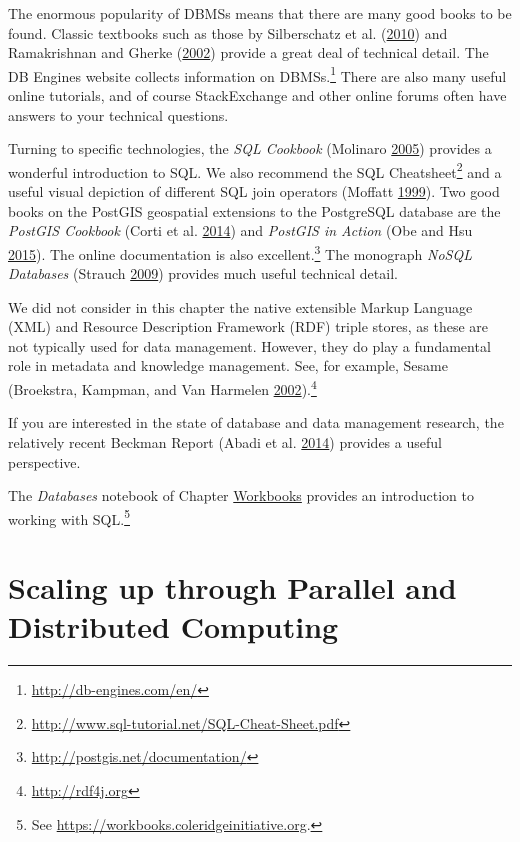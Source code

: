 \documentclass[]{krantz}
\begin{document}
The enormous popularity of DBMSs means that there are many good books to
be found. Classic textbooks such as those by Silberschatz et al.
(\protect\hyperlink{ref-silberschatz2010database}{2010}) and
Ramakrishnan and Gherke
(\protect\hyperlink{ref-ramakrishnan2000database}{2002}) provide a great
deal of technical detail. The DB Engines website collects information on
DBMSs.\footnote{\url{http://db-engines.com/en/}} There are also many
useful online tutorials, and of course StackExchange and other online
forums often have answers to your technical questions.

Turning to specific technologies, the \emph{SQL Cookbook} (Molinaro
\protect\hyperlink{ref-SQLCookbook}{2005}) provides a wonderful
introduction to SQL. We also recommend the SQL Cheatsheet\footnote{\url{http://www.sql-tutorial.net/SQL-Cheat-Sheet.pdf}}
and a useful visual depiction of different SQL join operators (Moffatt
\protect\hyperlink{ref-vizjoins}{1999}). Two good books on the PostGIS
geospatial extensions to the PostgreSQL database are the \emph{PostGIS
Cookbook} (Corti et al. \protect\hyperlink{ref-PostGISCookbook}{2014})
and \emph{PostGIS in Action} (Obe and Hsu
\protect\hyperlink{ref-PostGISInAction}{2015}). The online documentation
is also excellent.\footnote{\url{http://postgis.net/documentation/}} The
monograph \emph{NoSQL Databases} (Strauch
\protect\hyperlink{ref-NoSQLdatabases}{2009}) provides much useful
technical detail.

We did not consider in this chapter the native extensible Markup
Language (XML) and Resource Description Framework (RDF) triple stores,
as these are not typically used for data management. However, they do
play a fundamental role in metadata and knowledge management. See, for
example, Sesame (Broekstra, Kampman, and Van Harmelen
\protect\hyperlink{ref-broekstra2002sesame}{2002}).\footnote{\url{http://rdf4j.org}}

If you are interested in the state of database and data management
research, the relatively recent Beckman Report (Abadi et al.
\protect\hyperlink{ref-abadi2014beckman}{2014}) provides a useful
perspective.

The \emph{Databases} notebook of Chapter
\protect\hyperlink{chap:workbooks}{Workbooks} provides an introduction
to working with SQL.\footnote{See
  \url{https://workbooks.coleridgeinitiative.org}.}

\hypertarget{chap:parallel}{\chapter{Scaling up through Parallel and
Distributed Computing}\label{chap:parallel}}
\end{document}
